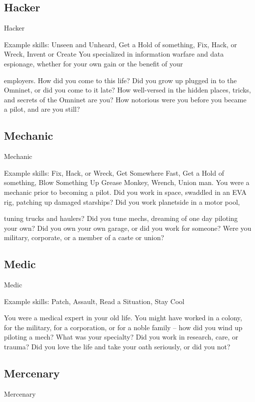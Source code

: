 \subsection{Hacker}
                                                     Hacker

Example skills: Unseen and Unheard, Get a Hold of something, Fix, Hack, or Wreck, Invent or
Create
You specialized in information warfare and data espionage, whether for your own gain or the benefit of your

employers. How did you come to this life? Did you grow up plugged in to the Omninet, or did you come to
it late? How well-versed in the hidden places, tricks, and secrets of the Omninet are you? How notorious
were you before you became a pilot, and are you still?

\subsection{Mechanic}
                                                   Mechanic

Example skills: Fix, Hack, or Wreck, Get Somewhere Fast, Get a Hold of something, Blow
Something Up
Grease Monkey, Wrench, Union man. You were a mechanic prior to becoming a pilot. Did you work in
space, swaddled in an EVA rig, patching up damaged starships? Did you work planetside in a motor pool,

tuning trucks and haulers? Did you tune mechs, dreaming of one day piloting your own? Did you own your
own garage, or did you work for someone? Were you military, corporate, or a member of a caste or union?

\subsection{Medic}
                                                      Medic

Example skills: Patch, Assault, Read a Situation, Stay Cool




You were a medical expert in your old life. You might have worked in a colony, for the military, for a
corporation, or for a noble family -- how did you wind up piloting a mech? What was your specialty? Did
you work in research, care, or trauma? Did you love the life and take your oath seriously, or did you not?

\subsection{Mercenary}
                                                    Mercenary

